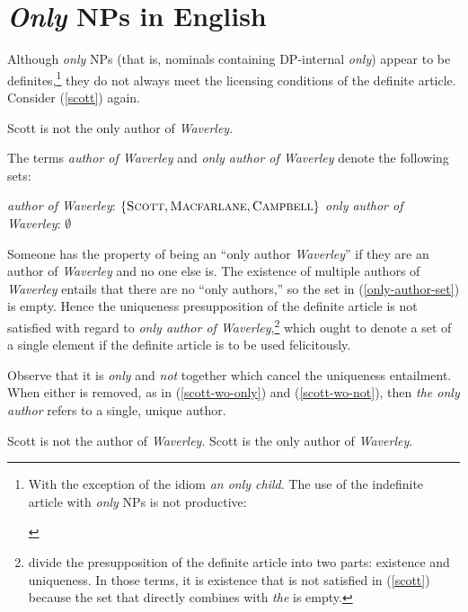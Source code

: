 \section{\textit{Only} NPs in English \label{sec:only-nps-english}}
Although \textit{only} NPs (that is, nominals containing DP-internal \textit{only}) appear to be definites,\footnote{With the exception of the idiom \textit{an only child}. The use of the indefinite article with \textit{only} NPs is not productive: \begin{exe}  \end{exe}} they do not always meet the licensing conditions of the definite article. Consider (\ref{scott}) again.

\begin{exe}
	 Scott is not the only author of \textit{Waverley}.
\end{exe}

The terms \textit{author of Waverley} and \textit{only author of Waverley} denote the following sets:

\begin{exe}
	\ex \textit{author of Waverley}: $\lbrace \textsc{Scott}, \textsc{Macfarlane}, \textsc{Campbell} \rbrace$
	\ex \label{only-author-set} \textit{only author of Waverley}: $\emptyset$
\end{exe}

Someone has the property of being an ``only author \textit{Waverley}'' if they are an author of \textit{Waverley} and no one else is. The existence of multiple authors of \textit{Waverley} entails that there are no ``only authors,'' so the set in (\ref{only-author-set}) is empty. Hence the uniqueness presupposition of the definite article is not satisfied with regard to \textit{only author of Waverley},\footnote{\citet{cb2015} divide the presupposition of the definite article into two parts: existence and uniqueness. In those terms, it is existence that is not satisfied in (\ref{scott}) because the set that directly combines with \textit{the} is empty.} which ought to denote a set of a single element if the definite article is to be used felicitously.

Observe that it is \textit{only} and \textit{not} together which cancel the uniqueness entailment. When either is removed, as in (\ref{scott-wo-only}) and (\ref{scott-wo-not}), then \textit{the only author} refers to a single, unique author.

\begin{exe}
	\ex \label{scott-wo-only} Scott is not the author of \textit{Waverley}.
	\ex \label{scott-wo-not} Scott is the only author of \textit{Waverley}.
\end{exe}

